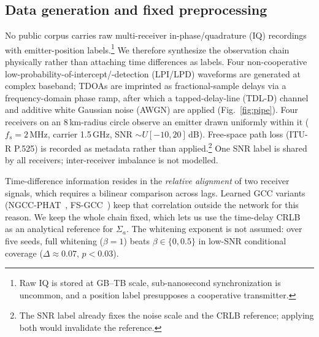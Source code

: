 \documentclass{article}
\begin{document}
\subsection{Data generation and fixed preprocessing}
\label{sec:gen}
No public corpus carries raw multi-receiver in-phase/quadrature (IQ)
recordings with emitter-position
labels.\footnote{Raw IQ is stored at GB--TB scale, sub-nanosecond
synchronization is uncommon, and a position label
presupposes a cooperative transmitter.} We therefore synthesize the
observation chain physically rather than attaching time differences as
labels. Four non-cooperative low-probability-of-intercept/-detection
(LPI/LPD) waveforms are generated at complex
baseband; TDOAs are imprinted as fractional-sample delays via a
frequency-domain phase ramp, after which a tapped-delay-line (TDL-D) channel~\cite{tr38901}
and additive white Gaussian noise (AWGN) are applied (Fig.~\ref{fig:pipe}). Four receivers on an 8\,km-radius
circle observe an emitter drawn uniformly within it ($f_s=2$\,MHz, carrier
1.5\,GHz, SNR $\sim U[-10,20]$\,dB). Free-space path loss (ITU-R P.525) is
recorded as metadata rather than applied.\footnote{The SNR label already
fixes the noise scale and the CRLB reference; applying both would
invalidate the reference.} One SNR label is shared by all receivers;
inter-receiver imbalance is not modelled.

Time-difference information resides in the \emph{relative alignment} of two
receiver signals, which requires a bilinear comparison across lags. Learned
GCC variants (NGCC-PHAT~\cite{berg2022}, FS-GCC~\cite{cobos2020,comanducci2020}) keep that
correlation outside the network for this reason. We keep the whole chain
fixed, which lets us use the time-delay CRLB~\cite{stein1981} as an
analytical reference for $\Sigma_a$. The whitening exponent is not assumed: over
five seeds, full whitening ($\beta=1$) beats $\beta\in\{0,0.5\}$ in
low-SNR conditional coverage ($\Delta\approx0.07$, $p<0.03$).
\end{document}
